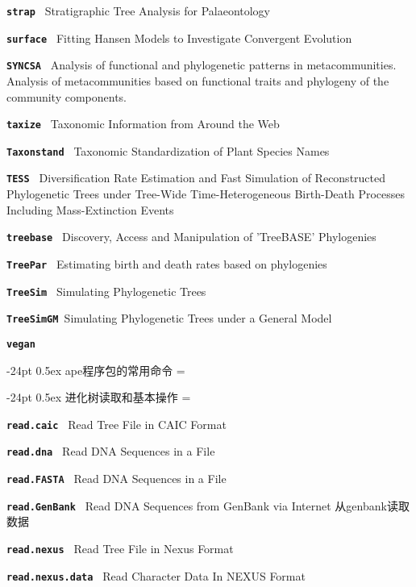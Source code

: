 \documentclass[10pt,landscape]{article}
\makeatletter
\renewcommand\section{\@startsection{section}{1}{0mm}%
                                     {-24pt}%
                                     {0.5ex}%
                                {\color{blue}\normalfont\large\bfseries}}
\newcommand{\bcode}[1]{\texttt{\textbf{#1}}}
\makeatother
\begin{document}
\begin{CJK}{UTF8}{gbsn}
\begin{multicols}{3}
\bcode{strap          }     Stratigraphic Tree Analysis for Palaeontology

\bcode{surface        }     Fitting Hansen Models to Investigate Convergent Evolution

\bcode{SYNCSA         }  Analysis of functional and phylogenetic patterns in metacommunities. Analysis of metacommunities based on functional traits and phylogeny of the community components.

\bcode{taxize         } Taxonomic Information from Around the Web

\bcode{Taxonstand     } Taxonomic Standardization of Plant Species Names

\bcode{TESS           }     Diversification Rate Estimation and Fast Simulation of Reconstructed Phylogenetic Trees under Tree-Wide Time-Heterogeneous Birth-Death Processes Including Mass-Extinction Events

\bcode{treebase       } Discovery, Access and Manipulation of 'TreeBASE' Phylogenies

\bcode{TreePar        } Estimating birth and death rates based on phylogenies

\bcode{TreeSim        }     Simulating Phylogenetic Trees

\bcode{TreeSimGM      }Simulating Phylogenetic Trees under a General Model

\bcode{vegan          }


\section{ape程序包的常用命令}
\everypar={\hangindent=9mm}

\section{进化树读取和基本操作}
\everypar={\hangindent=9mm}

\bcode{read.caic         }   Read Tree File in CAIC Format

\bcode{read.dna          }   Read DNA Sequences in a File

\bcode{read.FASTA        }   Read DNA Sequences in a File

\bcode{read.GenBank      }   Read DNA Sequences from GenBank via Internet 从genbank读取数据

\bcode{read.nexus        }   Read Tree File in Nexus Format

\bcode{read.nexus.data   }   Read Character Data In NEXUS Format


\end{multicols}
\end{CJK}
\end{document}

